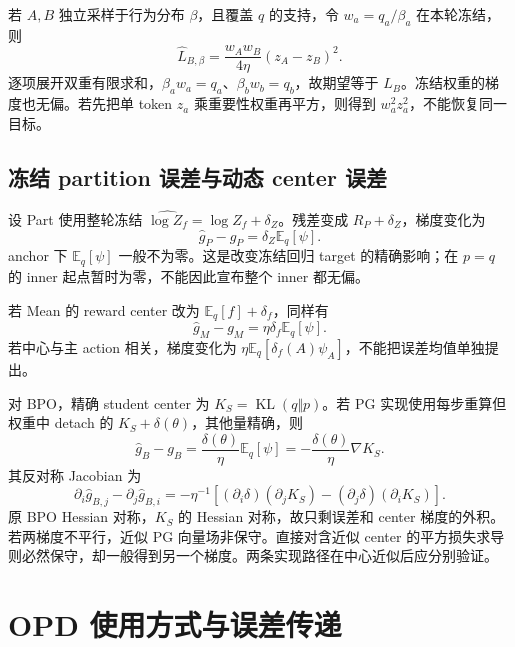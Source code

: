 \documentclass[lang=cn,scheme=chinese,openany]{../book/elegantbook}
\newcommand{\E}{\mathbb E}
\newcommand{\KL}{\operatorname{KL}}
\begin{document}
若 $A,B$ 独立采样于行为分布 $\beta$，且覆盖 $q$ 的支持，令 $w_a=q_a/\beta_a$ 在本轮冻结，则
\begin{equation}
\widehat L_{B,\beta}=\frac{w_Aw_B}{4\eta}(z_A-z_B)^2.
\end{equation}
逐项展开双重有限求和，$\beta_aw_a=q_a$、$\beta_bw_b=q_b$，故期望等于 $L_B$。冻结权重的梯度也无偏。若先把单 token $z_a$ 乘重要性权重再平方，则得到 $w_a^2z_a^2$，不能恢复同一目标。

\subsection{冻结 partition 误差与动态 center 误差}
\label{est:center-error}
设 Part 使用整轮冻结 $\widehat{\log Z_f}=\log Z_f+\delta_Z$。残差变成 $R_P+\delta_Z$，梯度变化为
\begin{equation}
\widehat g_P-g_P=\delta_Z \E_q[\psi].
\end{equation}
anchor 下 $\E_q[\psi]$ 一般不为零。这是改变冻结回归 target 的精确影响；在 $p=q$ 的 inner 起点暂时为零，不能因此宣布整个 inner 都无偏。

若 Mean 的 reward center 改为 $\E_q[f]+\delta_f$，同样有
\begin{equation}
\widehat g_M-g_M=\eta\delta_f \E_q[\psi].
\end{equation}
若中心与主 action 相关，梯度变化为 $\eta\E_q[\delta_f(A)\psi_A]$，不能把误差均值单独提出。

对 BPO，精确 student center 为 $K_S=\KL(q\Vert p)$。若 PG 实现使用每步重算但权重中 detach 的 $K_S+\delta(\theta)$，其他量精确，则
\begin{equation}
\widehat g_B-g_B=\frac{\delta(\theta)}\eta \E_q[\psi]
=-\frac{\delta(\theta)}\eta\nabla K_S.
\end{equation}
其反对称 Jacobian 为
\begin{equation}
\partial_i\widehat g_{B,j}-\partial_j\widehat g_{B,i}
=-\eta^{-1}[(\partial_i\delta)(\partial_jK_S)-(\partial_j\delta)(\partial_iK_S)].
\end{equation}
原 BPO Hessian 对称，$K_S$ 的 Hessian 对称，故只剩误差和 center 梯度的外积。若两梯度不平行，近似 PG 向量场非保守。直接对含近似 center 的平方损失求导则必然保守，却一般得到另一个梯度。两条实现路径在中心近似后应分别验证。



\section{OPD 使用方式与误差传递}
\label{est:sec:kl-opd-roles}
\end{document}
